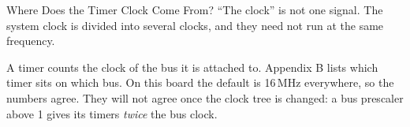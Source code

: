 \documentclass[9pt,aspectratio=169,xcolor=table]{beamer}
\begin{document}
\begin{frame}{Where Does the Timer Clock Come From?}
    \leavevmode
    ``The clock'' is not one signal. The system clock is divided into several clocks, and they need not run at the same frequency.

    \vspace{2mm}
    \begin{center}
    \end{center}

    \vspace{1mm}
    {\small A timer counts the clock of \alert{the bus it is attached to}. Appendix B lists which timer sits on which bus. On this board the default is 16\,MHz everywhere, so the numbers agree. They will not agree once the clock tree is changed: a bus prescaler above 1 gives its timers \emph{twice} the bus clock.}
\end{frame}
\end{document}
